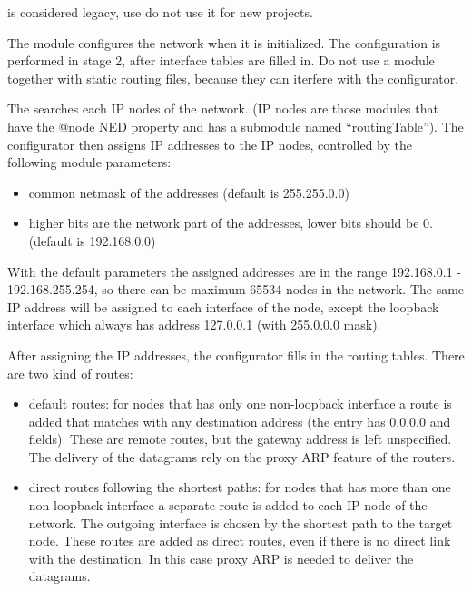 \begin{warning}
 is considered
legacy, use do not use it for new projects.
\end{warning}

The  module configures
the network when it is initialized. The configuration
is performed in stage 2, after interface tables are
filled in. Do not use a 
module together with static routing files, because they
can iterfere with the configurator.

The  searches each IP nodes of the network.
(IP nodes are those modules that have the @node NED property and
has a  submodule named ``routingTable'').
The configurator then assigns IP addresses to the IP nodes, controlled
by the following module parameters:
\begin{itemize}
  \item {} common netmask of the addresses (default is 255.255.0.0)
  \item {} higher bits are the network part of the addresses,
        lower bits should be 0. (default is 192.168.0.0)
\end{itemize}

With the default parameters the assigned addresses are in the range
192.168.0.1 - 192.168.255.254, so there can be maximum 65534 nodes in the
network. The same IP address will be assigned to each interface
of the node, except the loopback interface which always has address 127.0.0.1
(with 255.0.0.0 mask).

After assigning the IP addresses, the configurator fills in the routing tables.
There are two kind of routes:
\begin{itemize}
  \item default routes: for nodes that has only one non-loopback interface
        a route is added that matches with any destination address
        (the entry has 0.0.0.0  and  fields).
        These are remote routes, but the gateway address is left unspecified.
        The delivery of the datagrams rely on the proxy ARP feature of the
        routers.
  \item direct routes following the shortest paths: for nodes that has more
        than one non-loopback interface a separate route is added to each
        IP node of the network. The outgoing interface is chosen by the
        shortest path to the target node. These routes are
        added as direct routes, even if there is no direct link with the
        destination. In this case proxy ARP is needed to deliver the datagrams.
\end{itemize}

